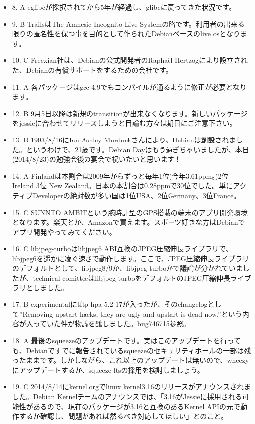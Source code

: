 \documentclass[mingoth,a4paper]{jsarticle}
\begin{document}
\begin{itemize}
\item
8. A eglibcが採択されてから5年が経過し、glibcに戻ってきた状況です。
\item
9. B TrailsはThe Amnesic Incognito Live Systemの略です。利用者の出来る限りの匿名性を保つ事を目的として作られたDebianベースのlive osとなります。
\item
10. C Freexian社は、Debianの公式開発者のRapha\"el Hertzogにより設立された、Debianの有償サポートをするための会社です。
\item
11. A 各パッケージはgcc-4.9でもコンパイルが通るように修正が必要となります。
\item
12. B 9月5日以降は新規のtransitionが出来なくなります。新しいパッケージをjessieに合わせてリリースしようと目論む方々は期日にご注意下さい。
\item
13. B 1993/8/16にIan Ashley Murdockさんにより、Debianは創設されました。というわけで、21歳です。Debian Dayはもう過ぎちゃいましたが、本日(2014/8/23)の勉強会後の宴会で祝いたいと思います！
\item
14. A Finlandは本割合は2009年からずっと毎年1位(今年3.61ppm。)2位 Ireland 3位 New Zealand。日本の本割合は0.28ppmで30位でした。単にアクティブDeveloperの絶対数が多い国は1位USA、2位Germany、3位France。
\item
15. C SUNNTO AMBITという腕時計型のGPS搭載の端末のアプリ開発環境となります。楽天とか、Amazonで買えます。スポーツ好きな方はDebianでアプリ開発やってみてください。
\item
16. C libjpeg-turboはlibjpeg6 ABI互換のJPEG圧縮伸長ライブラリで、libjpeg6を遥かに凌ぐ速さで動作します。ここで、JPEG圧縮伸長ライブラリのデフォルトとして、libjpeg8/9か、libjpeg-turboかで議論が分かれていましたが、technical comitteeはlibjpeg-turboをデフォルトのJPEG圧縮伸長ライブラリとしました。
\item
17. B experimentalにtftp-hpa 5.2-17が入ったが、そのchangelogとして''Removing upstart hacks, they are ugly and upstart is dead now.''という内容が入っていた件が物議を醸しました。bug746715参照。
\item
18. A 最後のsqueezeのアップデートです。実はこのアップデートを行っても、Debianですでに報告されているsqueezeのセキュリティホールの一部は残ったままです。しかしながら、これ以上のアップデートは無いので、wheezyにアップデートするか、squeeze-ltsの採用を検討しましょう。
\item
19. C 2014/8/14にkernel.orgでlinux kernel3.16のリリースがアナウンスされました。Debian Kernelチームのアナウンスでは、「3.16がJessieに採用される可能性があるので、現在のパッケージが3.16と互換のあるKernel APIの元で動作するか確認し、問題があれば然るべき対応してほしい」とのこと。

\end{itemize}
\end{document}
